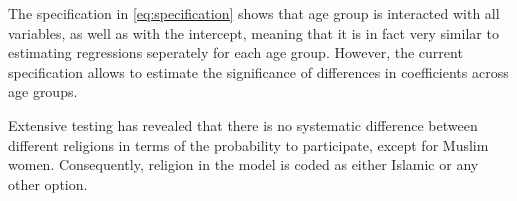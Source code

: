 The specification in \eqref{eq:specification} shows that age group is interacted with all variables, as well as with the intercept, meaning that it is in fact very similar to estimating regressions seperately for each age group. However, the current specification allows to estimate the significance of differences in coefficients across age groups. 

Extensive testing has revealed that there is no systematic difference between different religions in terms of the probability to participate, except for Muslim women. Consequently, religion in the model is coded as either Islamic or any other option.

